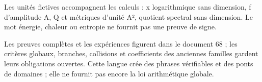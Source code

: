 \documentclass[
  9pt,
  a4paper,
]{article}
\begin{document}
Les unités fictives accompagnent les calculs : x logarithmique sans
dimension, f d'amplitude A, Q et métriques d'unité A², quotient spectral
sans dimension. Le mot énergie, chaleur ou entropie ne fournit pas une
preuve de signe.

Les preuves complètes et les expériences figurent dans le document 68 ;
les critères globaux, branches, collisions et coefficients des anciennes
familles gardent leurs obligations ouvertes. Cette langue crée des
phrases vérifiables et des ponts de domaines ; elle ne fournit pas
encore la loi arithmétique globale.
\end{document}
